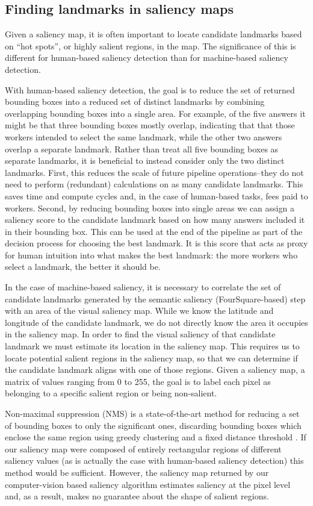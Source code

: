 \subsection{Finding landmarks in saliency maps}
Given a saliency map, it is often important to locate candidate landmarks based on “hot spots”, or highly salient regions, in the map. The significance of this is different for human-based saliency detection than for machine-based saliency detection.

With human-based saliency detection, the goal is to reduce the set of returned bounding boxes into a reduced set of distinct landmarks by combining overlapping bounding boxes into a single area. For example, of the five answers it might be that three bounding boxes mostly overlap, indicating that that those workers intended to select the same landmark, while the other two answers overlap a separate landmark. Rather than treat all five bounding boxes as separate landmarks, it is beneficial to instead consider only the two distinct landmarks. First, this reduces the scale of future pipeline operations--they do not need to perform (redundant) calculations on as many candidate landmarks. This saves time and compute cycles and, in the case of human-based tasks, fees paid to workers. Second, by reducing bounding boxes into single areas we can assign a saliency score to the candidate landmark based on how many answers included it in their bounding box. This can be used at the end of the pipeline as part of the decision process for choosing the best landmark. It is this score that acts as proxy for human intuition into what makes the best landmark: the more workers who select a landmark, the better it should be.

In the case of machine-based saliency, it is necessary to correlate the set of candidate landmarks generated by the semantic saliency (FourSquare-based) step with an area of the visual saliency map. While we know the latitude and longitude of the candidate landmark, we do not directly know the area it occupies in the saliency map. In order to find the visual saliency of that candidate landmark we must estimate its location in the saliency map. This requires us to locate potential salient regions in the saliency map, so that we can determine if the candidate landmark aligns with one of those regions. 
Given a saliency map, a matrix of values ranging from 0 to 255, the goal is to label each pixel as belonging to a specific salient region or being non-salient. 

Non-maximal suppression (NMS) is a state-of-the-art method for reducing a set of bounding boxes to only the significant ones, discarding bounding boxes which enclose the same region using greedy clustering and a fixed distance threshold \cite{neubeck2006efficient}. If our saliency map were composed of entirely rectangular regions of different saliency values (as is actually the case with human-based saliency detection) this method would be sufficient. However, the saliency map returned by our computer-vision based saliency algorithm estimates saliency at the pixel level and, as a result, makes no guarantee about the shape of salient regions.

